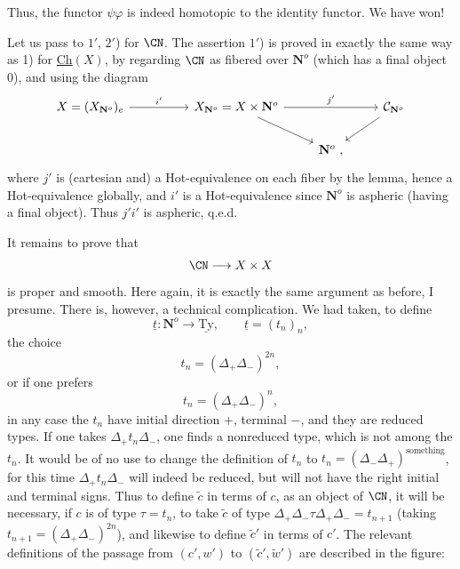 
Thus, the functor $\psi\varphi$ is indeed homotopic to the identity functor. We have won!

Let us pass to $1'$, $2'$) for $\CN$. The assertion $1'$) is proved in exactly the same way as 1) for \underline{Ch}$(X)$, by regarding $\CN$ as fibered over $\mathbf{N}^o$ (which has a final object 0), and using the diagram
\[
\begin{tikzcd}
X = (X_{\mathbf{N}^o})_e \arrow[rr, "i'"] & & X_{\mathbf{N}^o} = X \times \mathbf{N}^o \arrow[rr, "j'"] \arrow[dr] & & \mathcal{C}_{\mathbf{N}^o} \arrow[dl] \\
 & & & \mathbf{N}^o \ , &
\end{tikzcd}
\]
where $j'$ is (cartesian and) a Hot-equivalence on each fiber by the lemma, hence a Hot-equivalence globally, and $i'$ is a Hot-equivalence since $\mathbf{N}^o$ is aspheric (having a final object). Thus $j'i'$ is aspheric, q.e.d.

It remains to prove that
\[ \CN \longrightarrow X \times X \]
is proper and smooth. Here again,
it is exactly the same argument as before, I presume. There is, however, a technical complication. We had taken, to define
\[ \underline{t} : \mathbf{N}^o \longrightarrow \underline{\mathrm{Ty}}, \qquad \underline{t} = (t_n)_n, \]
the choice
\[ t_n = (\Delta_+\Delta_-)^{2n}, \]
or if one prefers
\[ t_n = (\Delta_+\Delta_-)^n, \]
in any case the $t_n$ have initial direction $+$, terminal $-$, and they are reduced types. If one takes $\Delta_+t_n\Delta_-$, one finds a nonreduced type, which is not among the $t_n$. It would be of no use to change the definition of $t_n$ to $t_n = (\Delta_-\Delta_+)^{\text{something}}$, for this time $\Delta_+t_n\Delta_-$ will indeed be reduced, but will not have the right initial and terminal signs. Thus to define $\tilde{c}$ in terms of $c$, as an object of $\CN$, it will be necessary, if $c$ is of type $\tau = t_n$, to take $\tilde{c}$ of type $\Delta_+\Delta_-\tau\Delta_+\Delta_- = t_{n+1}$ (taking $t_{n+1} = (\Delta_+\Delta_-)^{2n}$), and likewise to define $\tilde{c}'$ in terms of $c'$. The relevant definitions of the passage from $(c',w')$ to $(\tilde{c}',\tilde{w}')$ are described in the figure: %


